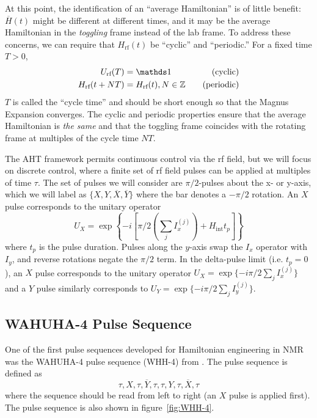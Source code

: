 At this point, the identification of an ``average Hamiltonian'' is of little benefit: $\overline{H}(t)$ might be different at different times, and it may be the average Hamiltonian in the \emph{toggling} frame instead of the lab frame. To address these concerns, we can require that $H_\text{rf}(t)$ be ``cyclic'' and ``periodic.'' For a fixed time $T>0$,
\begin{align}\label{eq:AHT-constraints}
    U_{\text{rf}}(T) &= \identity & \quad \text{(cyclic)} \\
    H_{\text{rf}}(t + NT) &= H_{\text{rf}}(t), N \in \Z & \quad \text{(periodic)}
\end{align}
$T$ is called the ``cycle time'' and should be short enough so that the Magnus Expansion converges.
The cyclic and periodic properties ensure that the average Hamiltonian is \emph{the same} and that the toggling frame coincides with the rotating frame at multiples of the cycle time $NT$.

The AHT framework permits continuous control via the rf field, but we will focus on discrete control, where a finite set of rf field pulses can be applied at multiples of time $\tau$. The set of pulses we will consider are $\pi/2$-pulses about the x- or y-axis, which we will label as $\{ X, Y, \overline{X}, \overline{Y} \}$ where the bar denotes a $-\pi/2$ rotation. An $X$ pulse corresponds to the unitary operator
\begin{equation}\label{eq:X-pulse}
    U_X = \exp\left\{-i
        \left[
            \pi/2 \left(\sum_j I_x^{(j)}\right) + H_{\text{int}} t_p
        \right]
    \right\}
\end{equation}
where $t_p$ is the pulse duration. Pulses along the $y$-axis swap the $I_x$ operator with $I_y$, and reverse rotations negate the $\pi/2$ term. In the delta-pulse limit (i.e. $t_p = 0$), an $X$ pulse corresponds to the unitary operator $U_X = \exp\{-i \pi/2 \sum_j I_x^{(j)}\}$ and a $Y$ pulse similarly corresponds to $U_Y = \exp\{-i \pi/2 \sum_j I_y^{(j)}\}$.

\subsection{WAHUHA-4 Pulse Sequence}\label{subsec:WHH-4}

One of the first pulse sequences developed for Hamiltonian engineering in NMR was the WAHUHA-4 pulse sequence (WHH-4) from \cite{PhysRevLett.20.180}. The pulse sequence is defined as
\begin{equation}
    \tau, X, \tau, \overline{Y}, \tau, \tau, Y, \tau, \overline{X}, \tau
\end{equation}
where the sequence should be read from left to right (an $X$ pulse is applied first). The pulse sequence is also shown in figure~\ref{fig:WHH-4}.

